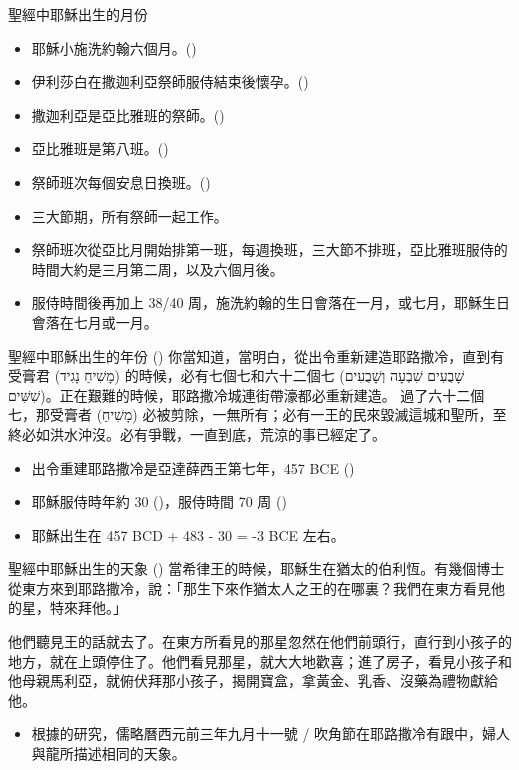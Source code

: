 \documentclass{beamer}
\newcommand{\parvspace}{\par\vspace{0.5em}}
\begin{document}
\begin{frame}{聖經中耶穌出生的月份}
  \begin{itemize}
    \item 耶穌小施洗約翰六個月。()
    \item 伊利莎白在撒迦利亞祭師服侍結束後懷孕。()
    \item 撒迦利亞是亞比雅班的祭師。()
    \item 亞比雅班是第八班。()
    \item 祭師班次每個安息日換班。()\parencite{AntiquitiesOfTheJews-7-14-7}
    \item 三大節期，所有祭師一起工作。\parencite{MishnahSukkah-5-7-8}
    \item 祭師班次從亞比月開始排第一班，每週換班，三大節不排班，亞比雅班服侍的時間大約是三月第二周，以及六個月後。
    \item 服侍時間後再加上 38/40 周，施洗約翰的生日會落在一月，或七月，耶穌生日會落在七月或一月。
  \end{itemize}
\end{frame}

\begin{frame}{聖經中耶穌出生的年份}
  () 你當知道，當明白，從\alert{出令重新建造耶路撒冷，直到有受膏君 (\texthebrew{מָשִׁיחַ נָגִיד}) 的時候，必有七個七和六十二個七 (\texthebrew{שָׁבֻעִים שִׁבְעָה וְשָׁבֻעִים שִׁשִּׁים})}。正在艱難的時候，耶路撒冷城連街帶濠都必重新建造。 \alert{過了六十二個七，那受膏者 (\texthebrew{מָשִׁיחַ}) 必被剪除}，一無所有；\alert{必有一王的民來毀滅這城和聖所，至終必如洪水沖沒。必有爭戰，一直到底，荒涼的事已經定了}。
  \begin{itemize}
    \item 出令重建耶路撒冷是亞達薛西王第七年，457 BCE ()
    \item 耶穌服侍時年約 30 ()，服侍時間 70 周 ()
    \item 耶穌出生在 457 BCD + 483 - 30 = -3 BCE 左右。
  \end{itemize}
\end{frame}

\begin{frame}{聖經中耶穌出生的天象}
  () 當希律王的時候，耶穌生在猶太的伯利恆。有幾個博士從東方來到耶路撒冷，說：「那生下來作猶太人之王的在哪裏？我們在東方\alert{看見他的星}，特來拜他。」\parvspace
  \textellipsis{}他們聽見王的話就去了。在東方所看見的那星忽然在他們前頭行，直行到小孩子的地方，就在上頭停住了。他們看見那星，就大大地歡喜；進了房子，看見小孩子和他母親馬利亞，就俯伏拜那小孩子，揭開寶盒，拿黃金、乳香、沒藥為禮物獻給他。\parvspace
  \begin{itemize}
    \item 根據\textcite{AstonishedTheWorld}的研究，儒略曆西元前三年九月十一號 / 吹角節在耶路撒冷有跟中，婦人與龍所描述相同的天象。\parencite{StarOfBethlehem}
  \end{itemize}
\end{frame}
\end{document}
